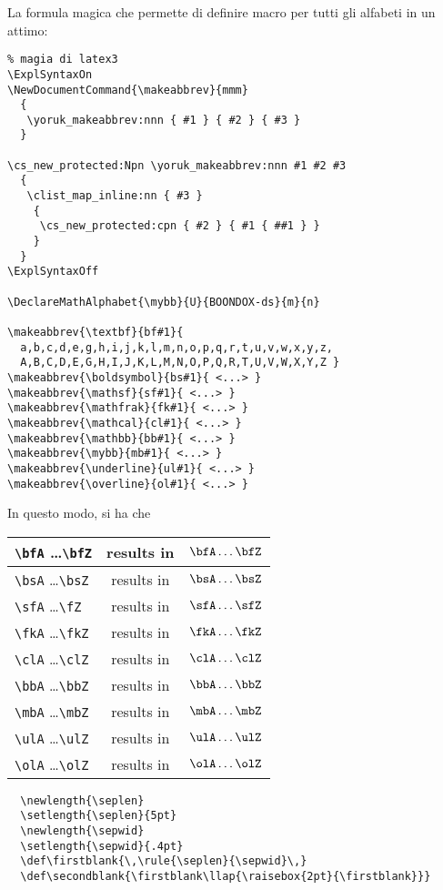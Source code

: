 \documentclass{amsart}
\begin{document}
La formula magica che permette di definire macro per tutti gli alfabeti in un attimo:
\begin{verbatim}
% magia di latex3
\ExplSyntaxOn
\NewDocumentCommand{\makeabbrev}{mmm}
  {
   \yoruk_makeabbrev:nnn { #1 } { #2 } { #3 }
  }

\cs_new_protected:Npn \yoruk_makeabbrev:nnn #1 #2 #3
  {
   \clist_map_inline:nn { #3 }
    {
     \cs_new_protected:cpn { #2 } { #1 { ##1 } }
    }
  }
\ExplSyntaxOff

\DeclareMathAlphabet{\mybb}{U}{BOONDOX-ds}{m}{n}

\makeabbrev{\textbf}{bf#1}{
  a,b,c,d,e,g,h,i,j,k,l,m,n,o,p,q,r,t,u,v,w,x,y,z,
  A,B,C,D,E,G,H,I,J,K,L,M,N,O,P,Q,R,T,U,V,W,X,Y,Z }
\makeabbrev{\boldsymbol}{bs#1}{ <...> }
\makeabbrev{\mathsf}{sf#1}{ <...> }
\makeabbrev{\mathfrak}{fk#1}{ <...> }
\makeabbrev{\mathcal}{cl#1}{ <...> }
\makeabbrev{\mathbb}{bb#1}{ <...> }
\makeabbrev{\mybb}{mb#1}{ <...> }
\makeabbrev{\underline}{ul#1}{ <...> }
\makeabbrev{\overline}{ol#1}{ <...> }
  \end{verbatim}
In questo modo, si ha che
\begin{table}[h]
  \begin{center}
    \begin{tabular}{lcr}
      \verb|\bfA| \dots \verb|\bfZ|   & results in & $\bfA \dots \bfZ$ \\ \midrule
      \verb|\bsA| \dots \verb|\bsZ|   & results in & $\bsA \dots \bsZ$ \\ \midrule
      \verb|\sfA| \dots \verb|\fZ|   & results in & $\sfA \dots \sfZ$ \\ \midrule
      \verb|\fkA| \dots \verb|\fkZ|   & results in & $\fkA \dots \fkZ$ \\ \midrule
      \verb|\clA| \dots \verb|\clZ|  & results in & $\clA \dots \clZ$ \\ \midrule
      \verb|\bbA| \dots \verb|\bbZ| & results in & $\bbA \dots \bbZ$ \\ \midrule
      \verb|\mbA| \dots \verb|\mbZ| & results in & $\mbA \dots \mbZ$ \\ \midrule
      \verb|\ulA| \dots \verb|\ulZ| & results in & $\ulA \dots \ulZ$ \\ \midrule
      \verb|\olA| \dots \verb|\olZ| & results in & $\olA \dots \olZ$ \\ \bottomrule
    \end{tabular}
  \end{center}
\end{table}
\begin{verbatim}
  \newlength{\seplen}
  \setlength{\seplen}{5pt}
  \newlength{\sepwid}
  \setlength{\sepwid}{.4pt}
  \def\firstblank{\,\rule{\seplen}{\sepwid}\,}
  \def\secondblank{\firstblank\llap{\raisebox{2pt}{\firstblank}}}
\end{verbatim}
\end{document}
